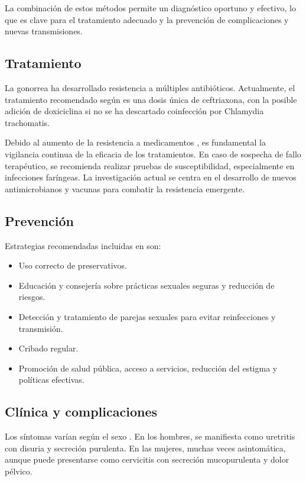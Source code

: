 La combinación de estos métodos permite un diagnóstico oportuno y efectivo, lo que es clave para el tratamiento adecuado y la prevención de complicaciones y nuevas transmisiones.

\subsection{Tratamiento}
La gonorrea ha desarrollado resistencia a múltiples antibióticos. Actualmente, el tratamiento recomendado según \cite{cyr2020update} es una dosis única de ceftriaxona, con la posible adición de doxiciclina si no se ha descartado coinfección por Chlamydia trachomatis.

Debido al aumento de la resistencia a medicamentos \cite{unemo2019antimicrobial}, es fundamental la vigilancia continua de la eficacia de los tratamientos. En caso de sospecha de fallo terapéutico, se recomienda realizar pruebas de susceptibilidad, especialmente en infecciones faríngeas. La investigación actual se centra en el desarrollo de nuevos antimicrobianos y vacunas para combatir la resistencia emergente.

\subsection{Prevención}
Estrategias recomendadas incluidas en \cite{mayor2012diagnosis} son:
\begin{itemize}
    \item Uso correcto de preservativos.
    \item Educación y consejería sobre prácticas sexuales seguras y reducción de riesgos.
    \item Detección y tratamiento de parejas sexuales para evitar reinfecciones y transmisión. 
    \item Cribado regular.
    \item Promoción de salud pública, acceso a servicios, reducción del estigma y políticas efectivas.
\end{itemize}

\subsection{Clínica y complicaciones}
Los síntomas varían según el sexo \cite{unemo2019gonorrhoea}. En los hombres, se manifiesta como uretritis con disuria y secreción purulenta. En las mujeres, muchas veces asintomática, aunque puede presentarse como cervicitis con secreción mucopurulenta y dolor pélvico.


